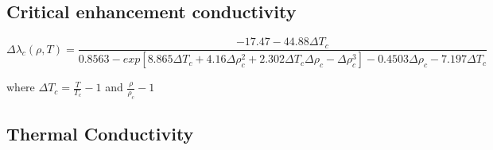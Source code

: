 \subsection{Critical enhancement conductivity}

\begin{equation}
    \Delta\lambda_c(\rho,T) = \frac{-17.47-44.88\Delta T_c}{0.8563-exp[8.865\Delta T_c +4.16\Delta \rho_c^2 + 2.302\Delta T_c \Delta\rho_c - \Delta\rho_c^3] -0.4503\Delta\rho_c - 7.197\Delta T_c}    
\end{equation}

where $\Delta T_c= \frac{T}{T_c}-1$ and $\frac{\rho}{\rho_c}-1$


\subsection{Thermal Conductivity}